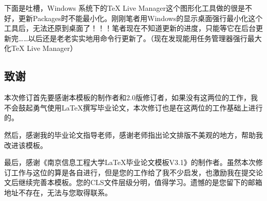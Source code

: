 下面是吐槽，Windows 系统下的TeX Live Manager这个图形化工具做的很是不好，更新Packages时不能最小化。刚刚笔者用Windows的显示桌面强行最小化这个工具后，无法还原到桌面了！！！笔者现在不知道更新的进度，只能等它在后台更新完……以后还是老老实实地用命令行更新了。（现在发现能用任务管理器强行最大化TeX Live Manager）

\subsection{致谢}
本次修订首先要感谢本模板的制作者和2.0版修订者，如果没有这两位的工作，我不会鼓起勇气使用\LaTeX 撰写毕业论文，本次修订也是在这两位的工作基础上进行的。

然后，感谢我的毕业论文指导老师，感谢老师指出论文排版不美观的地方，帮助我改进该模板。

最后，感谢《南京信息工程大学LaTeX毕业论文模板V3.1》的制作者。虽然本次修订工作与这位的算是各自进行，但是您的工作给了我不少启发，也激励我在提交论文后继续完善本模板。您的CLS文件层级分明，值得学习。遗憾的是您留下的邮箱地址不存在，无法与您取得联系。